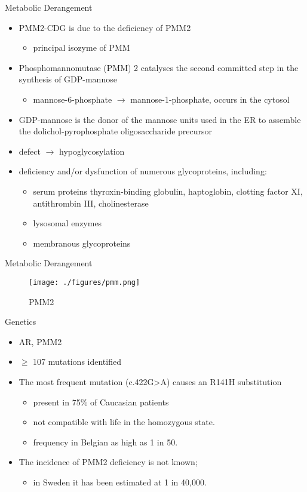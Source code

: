 \documentclass[presentation, smaller]{beamer}
\begin{document}
\begin{frame}[label={sec:org7eb739a}]{Metabolic Derangement}
\begin{itemize}
\item PMM2-CDG is due to the deficiency of PMM2
\begin{itemize}
\item principal isozyme of PMM
\end{itemize}
\item Phosphomannomutase (PMM) 2 catalyses the second committed step in the synthesis of GDP-mannose
\begin{itemize}
\item mannose-6-phosphate \(\to\) mannose-1-phosphate, occurs in the cytosol
\end{itemize}
\item GDP-mannose is the donor of the mannose units used in the ER to
assemble the dolichol-pyrophosphate oligosaccharide precursor
\item defect \(\to\) hypoglycosylation
\item deficiency and/or dysfunction of numerous glycoproteins, including:
\begin{itemize}
\item serum proteins thyroxin-binding globulin, haptoglobin, clotting factor XI, antithrombin III, cholinesterase
\item lysosomal enzymes
\item membranous glycoproteins
\end{itemize}
\end{itemize}
\end{frame}

\begin{frame}[label={sec:orgd8aa217}]{Metabolic Derangement}
\begin{figure}[htbp]
\centering
\texttt{[image: ./figures/pmm.png]}
\caption{\label{fig:orga926bc3}
PMM2}
\end{figure}
\end{frame}

\begin{frame}[label={sec:orgac8648b}]{Genetics}
\begin{itemize}
\item AR, PMM2
\item \(\ge\) 107 mutations identified
\item The most frequent mutation (c.422G>A) causes an R141H substitution
\begin{itemize}
\item present in 75\% of Caucasian patients
\item not compatible with life in the homozygous state.
\item frequency in Belgian as high as 1 in 50.
\end{itemize}
\item The incidence of PMM2 deficiency is not known;
\begin{itemize}
\item in Sweden it has been estimated at 1 in 40,000.
\end{itemize}
\end{itemize}
\end{frame}
\end{document}
